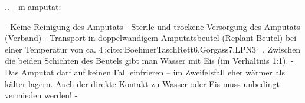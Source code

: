 
.. _m-amputat:


\begin{itemize}
  -   Keine Reinigung des Amputats
  -   Sterile und trockene Versorgung des Amputats
  (Verband)
  -   Transport in doppelwandigem
  Amputatsbeutel (Replant-Beutel) bei  einer Temperatur von
  ca. 4 \DegC:cite:`BoehmerTaschRett6,Gorgass7,LPN3`\ .
  Zwischen die beiden Schichten des Beutels gibt man Wasser
  mit Eis (im Verhältnis 1:1).
  -   Das Amputat darf auf keinen Fall einfrieren -- im
  Zweifelsfall eher wärmer als kälter lagern. Auch der
  direkte Kontakt zu Wasser oder Eis muss unbedingt
  vermieden werden!
  -   
\end{itemize}